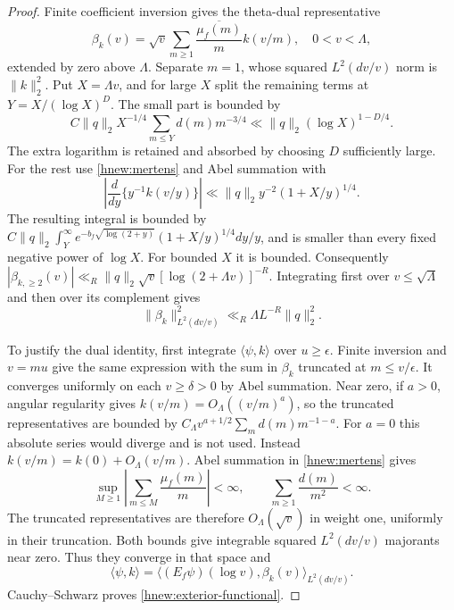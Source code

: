 \begin{proof}
Finite coefficient inversion gives the theta-dual representative
\[
 \beta_k(v)=\sqrt v\sum_{m\ge1}\frac{\overline{\mu_f(m)}}m k(v/m),
       \quad 0<v<\Lambda,
\]
extended by zero above $\Lambda$.
Separate $m=1$, whose squared $L^2(dv/v)$ norm is $\|k\|_2^2$.
Put $X=\Lambda v$, and for large $X$ split the remaining terms
at $Y=X/(\log X)^D$.  The small part is bounded by
\[
 C\|q\|_2X^{-1/4}\sum_{m\le Y}d(m)m^{-3/4}
       \ll\|q\|_2(\log X)^{1-D/4}.
\]
The extra logarithm is retained and absorbed by choosing $D$
sufficiently large.  For the rest use \eqref{hnew:mertens} and
Abel summation with
\[
 \left|\frac d{dy}\{y^{-1}k(v/y)\}\right|
       \ll\|q\|_2y^{-2}(1+X/y)^{1/4}.
\]
The resulting integral is bounded by
$C\|q\|_2\int_Y^\infty e^{-b_f\sqrt{\log(2+y)}}
(1+X/y)^{1/4}dy/y$, and is smaller than every fixed
negative power of $\log X$.
For bounded $X$ it is bounded.
Consequently
$|\beta_{k,\ge2}(v)|\ll_R\|q\|_2\sqrt v
[\log(2+\Lambda v)]^{-R}$.
Integrating first over $v\le\sqrt\Lambda$ and then over its
complement gives
\[
 \|\beta_k\|_{L^2(dv/v)}^2\ll_R\Lambda L^{-R}\|q\|_2^2.
\]

To justify the dual identity, first integrate
$\langle\psi,k\rangle$ over $u\ge\epsilon$.
Finite inversion and $v=mu$ give the same expression with the
sum in $\beta_k$ truncated at $m\le v/\epsilon$.
It converges uniformly on each $v\ge\delta>0$ by Abel summation.
Near zero, if $a>0$, angular regularity gives
$k(v/m)=O_\Lambda((v/m)^a)$, so the truncated representatives
are bounded by $C_\Lambda v^{a+1/2}\sum_m d(m)m^{-1-a}$.
For $a=0$ this absolute series would diverge and is not used.
Instead $k(v/m)=k(0)+O_\Lambda(v/m)$.
Abel summation in \eqref{hnew:mertens} gives
\[
 \sup_{M\ge1}\left|\sum_{m\le M}\frac{\mu_f(m)}m\right|<\infty,
 \qquad \sum_{m\ge1}\frac{d(m)}{m^2}<\infty.
\]
The truncated representatives are therefore
$O_\Lambda(\sqrt v)$ in weight one, uniformly in their
truncation.  Both bounds give integrable squared
$L^2(dv/v)$ majorants near zero.
Thus they converge in that space and
\[
 \langle\psi,k\rangle
   =\langle (E_f\psi)(\log v),\beta_k(v)\rangle_{L^2(dv/v)}.
\]
Cauchy--Schwarz proves \eqref{hnew:exterior-functional}.
\end{proof}

